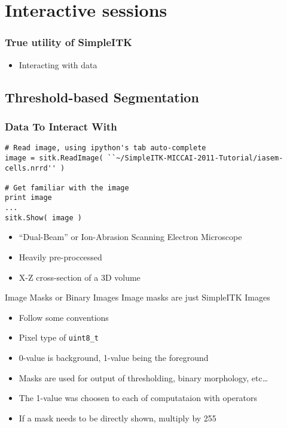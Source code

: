 \section{Interactive sessions}

%
%

\begin{frame}
\frametitle{True utility of SimpleITK}
\begin{itemize}
\item Interacting with data
\end{itemize}
\end{frame}

\subsection{Threshold-based Segmentation}

\begin{frame}[fragile]
\frametitle{Data To Interact With}
\lstpython
\begin{lstlisting}
# Read image, using ipython's tab auto-complete
image = sitk.ReadImage( ``~/SimpleITK-MICCAI-2011-Tutorial/iasem-cells.nrrd'' )

# Get familiar with the image
print image
...
sitk.Show( image )
\end{lstlisting}
\begin{itemize}
  \item ``Dual-Beam'' or Ion-Abrasion Scanning Electron Microscope
  \item Heavily pre-proccessed
  \item  X-Z cross-section of a 3D volume
\end{itemize}
\end{frame}

\begin{frame}{Image Masks or Binary Images}
Image masks are just SimpleITK Images
\begin{itemize}
  \item Follow some conventions
  \item Pixel type of \texttt{uint8\_t}
  \item 0-value is background, 1-value being the foreground
  \item Masks are used for output of thresholding, binary morphology, etc\dots
  \item The 1-value was choosen to each of computataion with operators
  \item If a mask needs to be directly shown, multiply by 255
\end{itemize}
\end{frame}



